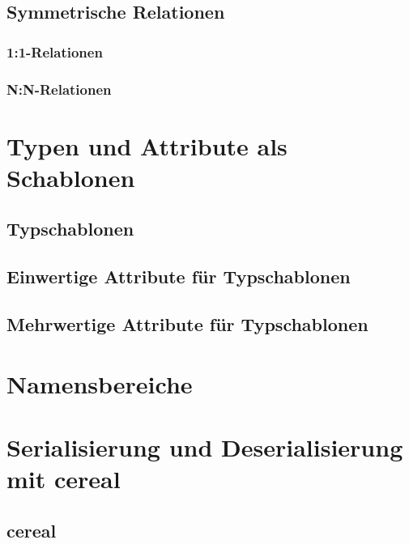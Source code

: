 \documentclass[oneside]{ausarbeitung}
\begin{document}
\section{Symmetrische Relationen}
\label{sec:relations_symmetric}

\subsection{1:1-Relationen}
\label{sub:relations_symmetric_1_1}

\subsection{N:N-Relationen}
\label{sub:relations_symmetric_N_N}

\chapter{Typen und Attribute als Schablonen}
\label{cha:templates}

\section{Typschablonen}
\label{sec:templates_types}

\section{Einwertige Attribute für Typschablonen}
\label{sec:templates_attributes_1}

\section{Mehrwertige Attribute für Typschablonen}
\label{sec:templates_attributes_N}

\chapter{Namensbereiche}
\label{cha:objects_namespaces}

\chapter{Serialisierung und Deserialisierung mit cereal}
\label{cha:templates}

\section{cereal}
\label{sec:cereal}
\end{document}

